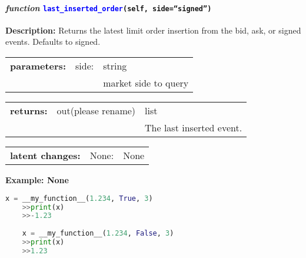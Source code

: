 \paragraph{\textit{function} \textcolor{blue}{\texttt{last\_inserted\_order}}\texttt{(self, side=``signed'')}}\hfill\break
\noindent \textbf{Description:} Returns the latest limit order insertion from the bid, ask, or signed events. Defaults to signed. 

\begin{tabular}{r r l }
	\textbf{parameters:}	& side: & string\\
	&  & market side to query \\
\end{tabular}

\begin{tabular}{l c l}
	\textbf{returns:} & out(please rename) & list\\
	& & The last inserted event. 
\end{tabular}

\begin{tabular}{l c l}
	\textbf{latent changes:} & None: & None\\
\end{tabular}

\textbf{Example: None}
\begin{lstlisting}[language=Python]
	x = __my_function__(1.234, True, 3)
	>>print(x)
	>>-1.23
	
	x = __my_function__(1.234, False, 3)
	>>print(x)
	>>1.23
\end{lstlisting}